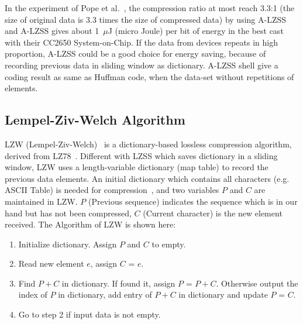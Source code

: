 

In the experiment of Pope et al.~\cite{pope2018accelerometer}, the compression ratio at most reach 3.3:1 (the size of original data is 3.3 times the size of compressed data) by using A-LZSS and A-LZSS
gives about 1~$\mu$J (micro Joule) per bit of energy in the best cast with their CC2650 System-on-Chip. If the data from devices
repeats in high proportion, A-LZSS could be a good choice for energy
saving, because of recording previous data in sliding window as dictionary.
A-LZSS shell give a coding result as same as Huffman code, when the data-set without repetitions of elements.


\subsection{Lempel-Ziv-Welch Algorithm}
LZW (Lempel-Ziv-Welch)~\cite{welch1984technique} is a dictionary-based lossless compression
algorithm, derived from LZ78~\cite{ziv1978compression}. Different with LZSS
which saves dictionary in a sliding window, LZW uses a length-variable
dictionary (map table) to record the previous data elements. An initial
dictionary which contains all characters (e.g. ASCII Table) is needed for
compression~\cite{welch1984technique}, and two variables $P$ and $C$ are
maintained in LZW. $P$ (Previous sequence) indicates the sequence which is in our hand
but has not been compressed, $C$ (Current character) is the new element received. The
Algorithm of LZW is shown here:

\begin{enumerate}
    \item Initialize dictionary. Assign $P$ and $C$ to empty.
    \item Read new element $e$, assign $C$ = $e$.
    \item Find $P+C$ in dictionary. If found it, assign $P$ = $P+C$. Otherwise
    output the index of $P$ in dictionary, add entry of $P+C$ in dictionary and
    update $P$ = $C$.
    \item Go to step 2 if input data is not empty.
\end{enumerate}

